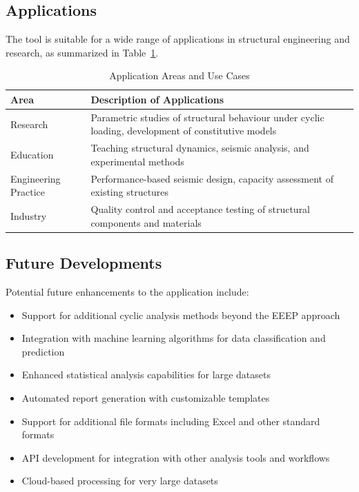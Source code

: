 \documentclass[11pt,a4paper]{article}
\begin{document}
\subsection{Applications}

The tool is suitable for a wide range of applications in structural engineering and research, as summarized in Table~\ref{tab:applications}.

\begin{table}[h]
\centering
\caption{Application Areas and Use Cases}\label{tab:applications}
\begin{tabular}{p{4cm}p{10cm}}
\toprule
\textbf{Area} & \textbf{Description of Applications} \\
\midrule
Research & Parametric studies of structural behaviour under cyclic loading, development of constitutive models \\
Education & Teaching structural dynamics, seismic analysis, and experimental methods \\
Engineering Practice & Performance-based seismic design, capacity assessment of existing structures \\
Industry & Quality control and acceptance testing of structural components and materials \\
\bottomrule
\end{tabular}
\end{table}

\subsection{Future Developments}

Potential future enhancements to the application include:

\begin{itemize}
    \item Support for additional cyclic analysis methods beyond the EEEP approach
    \item Integration with machine learning algorithms for data classification and prediction
    \item Enhanced statistical analysis capabilities for large datasets
    \item Automated report generation with customizable templates
    \item Support for additional file formats including Excel and other standard formats
    \item API development for integration with other analysis tools and workflows
    \item Cloud-based processing for very large datasets
\end{itemize}
\end{document}
